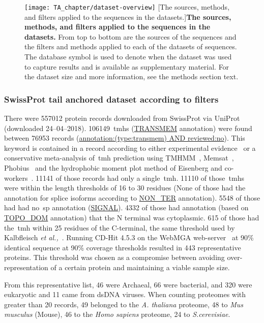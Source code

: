 \begin{figure}[!ht]
\centering
\texttt{[image: TA\_chapter/dataset-overview]}
        [The sources, methods, and filters applied to the sequences in the datasets.]{\textbf{The sources, methods, and filters applied to the sequences in the datasets.}
        From top to bottom are the sources of the sequences and the filters and methods applied to each of the datasets of sequences. The database symbol is used to denote when the dataset was used to capture results and is available as supplementary material. For the dataset size and more information, see the methods section text.
}

\label{fig:dataset-overview}
\end{figure}

\subsubsection{SwissProt tail anchored dataset according to filters}
There were 557012 protein records downloaded from SwissProt via UniProt~\cite{TheUniProtConsortium2014} (downloaded 24--04--2018).
106149~\gls{tmh}s (\url{TRANSMEM} annotation) were found between 76953 records (\url{annotation:(type:transmem) AND reviewed:no}).
This keyword is contained in a record according to either experimental evidence~\cite{TheUniProtConsortium2014} or a conservative meta-analysis of~\gls{tmh} prediction using TMHMM~\cite{Krogh2001}, Memsat~\cite{Jones2007}, Phobius~\cite{Kall2004,Kall2007} and the hydrophobic moment plot method of Eisenberg and co-workers~\cite{Eisenberg1984}.
11141 of those records had only a single~\gls{tmh}.
11110 of those~\gls{tmh}s were within the length thresholds of 16 to 30 residues (None of those had the annotation for splice isoforms according to \url{NON_TER} annotation).
5548 of those had had no~\gls{sp} annotation (\url{SIGNAL}).
4332 of those had annotation (based on \url{TOPO_DOM} annotation) that the N terminal was cytoplasmic.
615 of those had the~\gls{tmh} within 25 residues of the C\--terminal, the same threshold used by Kalbfleisch \textit{et al.,}~\cite{Kalbfleisch2007}.
Running CD-Hit 4.5.3 on the WebMGA web-server~\cite{Huang2010, Wu2011} at 90\% identical sequence at 90\% coverage thresholds resulted in 443 representative proteins.
This threshold was chosen as a compromise between avoiding over-representation of a certain protein and maintaining a viable sample size.

From this representative list, 46 were Archaeal, 66 were bacterial, and 320 were eukaryotic and 11 came from dsDNA viruses.
When counting proteomes with greater than 20 records, 49 belonged to the \textit{A. thaliana} proteome, 48 to \textit{Mus musculus} (Mouse), 46 to the \textit{Homo sapiens} proteome, 24 to \textit{S.cerevisiae}. %

